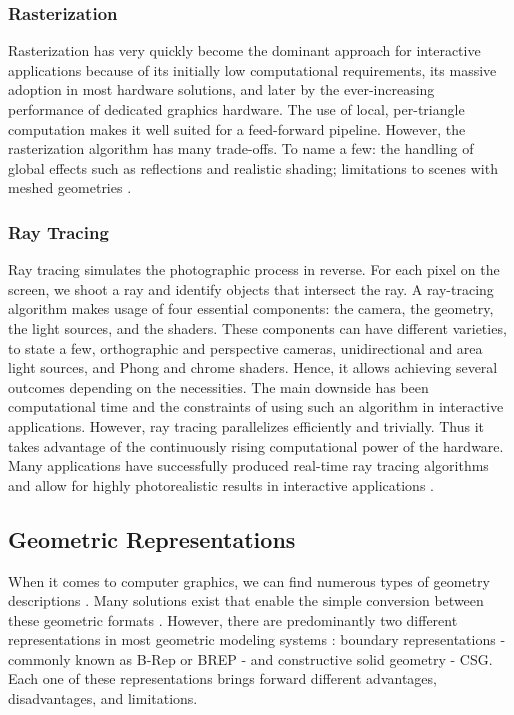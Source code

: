\documentclass[a4paper,11pt,oneside]{article}
\begin{document}
\subsubsection{Rasterization}
    
Rasterization has very quickly become the dominant approach for interactive applications because of its initially low computational requirements, its massive adoption in most hardware solutions, and later by the ever-increasing performance of dedicated graphics hardware. The use of local, per-triangle computation makes it well suited for a feed-forward pipeline. However, the rasterization algorithm has many trade-offs. To name a few: the handling of global effects such as reflections and realistic shading; limitations to scenes with meshed geometries \cite{rasterization_scratch_pixel}. 
    
\subsubsection{Ray Tracing}
     
Ray tracing simulates the photographic process in reverse. For each pixel on the screen, we shoot a ray and identify objects that intersect the ray. A ray-tracing algorithm makes usage of four essential components: the camera, the geometry, the light sources, and the shaders. These components can have different varieties, to state a few, orthographic and perspective cameras, unidirectional and area light sources, and Phong and chrome shaders. Hence, it allows achieving several outcomes depending on the necessities. The main downside has been computational time and the constraints of using such an algorithm in interactive applications. However, ray tracing parallelizes efficiently and trivially. Thus it takes advantage of the continuously rising computational power of the hardware. Many applications have successfully produced real-time ray tracing algorithms and allow for highly photorealistic results in interactive applications \cite{RT_RT1, RT_RT2}.
    
  
\subsection{Geometric Representations}
\label{sec:geometric_represections}

When it comes to computer graphics, we can find numerous types of geometry descriptions \cite{SOLIDREP_5, SOLIDREP_1, SOLIDREP_2, SOLIDREP_3, COMPUTING_SURVEYS,SOLIDREP_4}. Many solutions exist that enable the simple conversion between these geometric formats \cite{steuer_2012}. However, there are predominantly two different representations in most geometric modeling systems \cite{COMPUTING_SURVEYS}: boundary representations - commonly known as B-Rep or BREP - and constructive solid geometry - CSG. Each one of these representations brings forward different advantages, disadvantages, and limitations.
    
\end{document}
